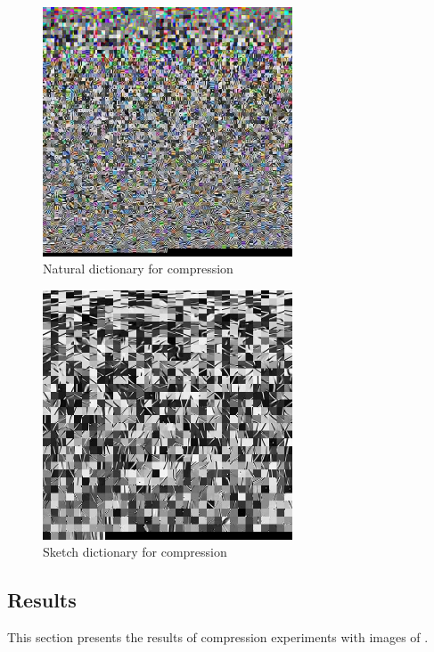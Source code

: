 \newpage
\begin{figure}[H]
\centering
\includegraphics[width = 0.66\textwidth]{images/natural_dict.jpg}
\caption{Natural dictionary for compression}\label{fig:naturalDict}
\end{figure}
\begin{figure}[H]
\centering
\includegraphics[width = 0.66\textwidth]{images/sketch_dict.jpg}
\caption{Sketch dictionary for compression}\label{fig:sketchDict}
\end{figure}


\clearpage
\subsection{Results}
This section presents the results of compression experiments with images
of .

